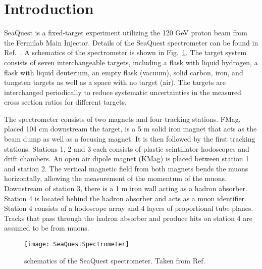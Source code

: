 \section{Introduction}
SeaQuest is a fixed-target experiment utilizing the 120 GeV proton beam from 
the Fermilab Main Injector. Details of the SeaQuest spectrometer can be found 
in Ref.\ \cite{aidala2019}. A schematics of the spectrometer is shown in Fig.\ 
\ref{fig:spectrometer}. The target system consists of seven interchangeable 
targets, including a flask with liquid hydrogen, a flask with liquid deuterium,
an empty flask (vacuum), solid carbon, iron, and tungsten targets as well as a 
space with no target (air). The targets are interchanged periodically to reduce 
systematic uncertainties in the measured cross section ratios for different 
targets.

The spectrometer consists of two magnets and four tracking stations. FMag, 
placed 104 cm downstream the target, is a 5 m solid iron magnet that acts as 
the beam dump as well as a focusing magnet. It is then followed by the first 
tracking stations. Stations 1, 2 and 3 each consists of plastic scintillator 
hodoscopes and drift chambers. An open air dipole magnet (KMag) is placed 
between station 1 and station 2. The vertical magnetic field from both magnets 
bends the muons horizontally, allowing the measurement of the momentum of the 
muons. Downstream of station 3, there is a 1 m iron wall acting as a hadron 
absorber. Station 4 is located behind the hadron absorber and acts as a muon 
identifier. Station 4 consists of a hodoscope array and 4 layers of 
proportional tube planes. Tracks that pass through the hadron absorber and 
produce hits on station 4 are assumed to be from muons. 

\begin{figure}[htbp!]
    \centering
    \texttt{[image: SeaQuestSpectrometer]}
    \caption{schematics of the SeaQuest spectrometer. Taken from Ref.\ 
		\cite{aidala2019}}
    \label{fig:spectrometer}
\end{figure}
\

